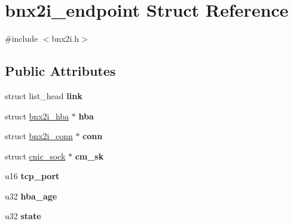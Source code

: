 \hypertarget{structbnx2i__endpoint}{
\section{bnx2i\_\-endpoint Struct Reference}
\label{structbnx2i__endpoint}
}


{\ttfamily \#include $<$bnx2i.h$>$}

\subsection*{Public Attributes}
\begin{DoxyCompactItemize}
\item 
\hypertarget{structbnx2i__endpoint_a664cead45bece82ba2c9f614005cd715}{
struct list\_\-head {\bfseries link}}
\label{structbnx2i__endpoint_a664cead45bece82ba2c9f614005cd715}

\item 
\hypertarget{structbnx2i__endpoint_a799a346fdf92364c193f1b1f27f2162f}{
struct \hyperlink{structbnx2i__hba}{bnx2i\_\-hba} $\ast$ {\bfseries hba}}
\label{structbnx2i__endpoint_a799a346fdf92364c193f1b1f27f2162f}

\item 
\hypertarget{structbnx2i__endpoint_aa5edae43cb71e101dc3c1b9544f6b3ea}{
struct \hyperlink{structbnx2i__conn}{bnx2i\_\-conn} $\ast$ {\bfseries conn}}
\label{structbnx2i__endpoint_aa5edae43cb71e101dc3c1b9544f6b3ea}

\item 
\hypertarget{structbnx2i__endpoint_ac4776792fa4fab5e3be7e8e3b2699a1b}{
struct \hyperlink{structcnic__sock}{cnic\_\-sock} $\ast$ {\bfseries cm\_\-sk}}
\label{structbnx2i__endpoint_ac4776792fa4fab5e3be7e8e3b2699a1b}

\item 
\hypertarget{structbnx2i__endpoint_aa7113e5ef5adc9bc45ad0c96a93dca3d}{
u16 {\bfseries tcp\_\-port}}
\label{structbnx2i__endpoint_aa7113e5ef5adc9bc45ad0c96a93dca3d}

\item 
\hypertarget{structbnx2i__endpoint_ae32687df6a0b2dcbf93c7f9ecc61ddf0}{
u32 {\bfseries hba\_\-age}}
\label{structbnx2i__endpoint_ae32687df6a0b2dcbf93c7f9ecc61ddf0}

\item 
\hypertarget{structbnx2i__endpoint_ac7bdefa6383531d739c7ce3f2b8360ab}{
u32 {\bfseries state}}
\label{structbnx2i__endpoint_ac7bdefa6383531d739c7ce3f2b8360ab}


\end{DoxyCompactItemize}
